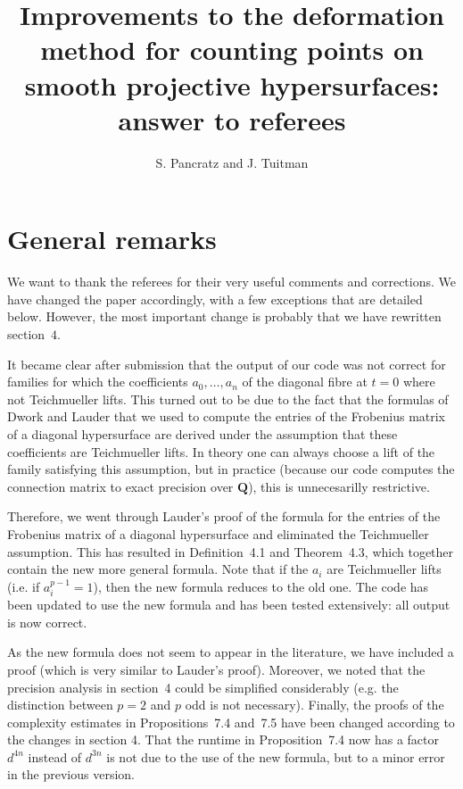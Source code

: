 \documentclass{article}
\title{Improvements to the deformation method for counting points on smooth projective hypersurfaces: answer to referees}
\author{S. Pancratz and J. Tuitman}
\begin{document}
\maketitle

\section*{General remarks}

We want to thank the referees for their very useful comments and corrections. We have changed the paper accordingly, with a few
exceptions that are detailed below. 
However, the most important change is probably that we have rewritten section~$4$.

It became clear
after submission that the output of our code was not correct for families for which the coefficients $a_0,\ldots,a_n$ of the diagonal fibre 
at $t=0$ where not Teichmueller lifts. This turned out to be due to the fact that the formulas of Dwork and Lauder that we used to compute
the entries of the Frobenius matrix of a diagonal hypersurface are derived under the assumption that these coefficients are Teichmueller lifts. In 
theory one can always choose a lift of the family satisfying this assumption, but in practice (because our code computes the connection
matrix to exact precision over $\mathbf{Q}$), this is unnecesarilly restrictive.

Therefore, we went through Lauder's proof of the formula for the entries of the Frobenius matrix of a diagonal hypersurface and eliminated
the Teichmueller assumption. This has resulted in Definition~4.1 and Theorem~4.3, which together contain the new more general formula. 
Note that if the $a_i$ are Teichmueller lifts (i.e. if $a_i^{p-1}=1$), then the new formula reduces to the old one. The code has been updated 
to use the new formula and has been tested extensively: all output is now correct. 

As the new formula does not seem to appear in the literature,
we have included a proof (which is very similar to Lauder's proof). Moreover, we noted that the precision analysis in section~4 could be simplified considerably (e.g.
the distinction between $p=2$ and $p$ odd is not necessary). Finally, the proofs of the complexity estimates in Propositions~7.4 and~7.5 
have been changed according to the changes in section 4. That the runtime in Proposition~7.4 now has a factor $d^{4n}$ instead of $d^{3n}$ is not due to the use of the new
formula, but to a minor error in the previous version. 
\end{document}

